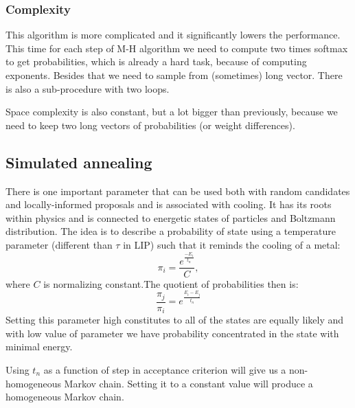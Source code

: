 	\subsubsection{Complexity}
		This algorithm is more complicated and it significantly lowers the performance. This time for each step of M-H algorithm we need to compute two times softmax to get probabilities, which is already a hard task, because of computing exponents. Besides that we need to sample from (sometimes) long vector. There is also a sub-procedure with two loops.
		
		Space complexity is  also constant, but a lot bigger than previously, because we need to keep two  long vectors of probabilities (or weight differences).
	
\subsection{Simulated annealing}
	There is one important parameter that can be used both with random candidates and locally-informed proposals and is associated with cooling. It has its roots within physics and is connected to energetic states of particles and Boltzmann distribution. The idea is to describe a probability of state using a temperature parameter (different than $\tau$ in LIP) such that it reminds the cooling of a metal:
	\begin{equation*}
		\pi_i = \frac{e^{\frac{-E_i}{t_n}}}{C},
	\end{equation*}
	where $C$ is normalizing constant.The quotient of probabilities then is:
	\begin{equation*}
		\frac{\pi_j}{\pi_i} = e^{\frac{E_i - E_j}{t_n}}
	\end{equation*}
	Setting this parameter high constitutes to all of the states are equally likely and with low value of parameter we have probability concentrated in the state with minimal energy.
	
	Using $t_n$ as a function of step in acceptance criterion will give us a non-homogeneous Markov chain. Setting it to a constant value will produce a homogeneous Markov chain.